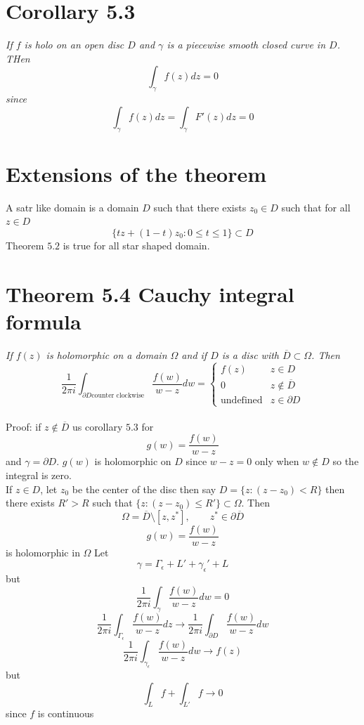 \documentclass[11pt]{article}
\begin{document}
\section{Corollary 5.3}
\emph{
    If $f$ is holo on an open disc $D$ and $\gamma$ is a piecewise smooth closed curve in  $D$. THen
    \[
    \int_{\gamma}^{}f(z)dz = 0
    \] 
    since
    \[
    \int_{\gamma}^{}f(z)dz = \int_{\gamma}^{}F'(z)dz = 0
    \] 
}

\section{Extensions of the theorem}
A satr like domain is a domain $D$ such that there exists  $z_0 \in D$ such that for all $z \in D$
 \[
     \{tz + (1-t)z_0 : 0 \le t \le 1\} \subset D
\] 
Theorem $5.2$ is true for all star shaped domain.

\section{Theorem 5.4 Cauchy integral formula}
\emph{
    If $f(z)$ is holomorphic on a domain  $\Omega$ and if  $D$ is a disc with $\overline{D} \subset \Omega$. Then
    \[
        \frac{1}{2\pi i} \int_{\partial D \text{counter clockwise}}^{}\frac{f(w)}{w-z}dw = 
        \begin{cases}
            f(z) & z \in D\\
            0 & z \not\in \overline{D}\\
            \text{undefined} & z \in \partial D
        \end{cases}
    \] 
}\\
Proof: if $z \not\in \overline{ D}$  us corollary $5.3$ for 
 \[
g(w) = \frac{f(w)}{w-z}
\] 
and $\gamma = \partial D$. $g(w)$ is holomorphic on  $D$ since  $w-z = 0 $ only when  $w \not\in D$ so the integral is zero.\\
If  $z \in D$, let $z_0$ be the center of the disc then say $D = \{z : (z-z_0) < R\}$ then there exists $ R' > R$ such that  $\{z : (z-z_0) \le R'\} \subset \Omega$.
Then
\[
    \Omega = \overline{D} \setminus [z,z^{*}], \qquad z^{*} \in \partial \overline{D}
\] 
\[
g(w) = \frac{f(w)}{w-z}
\] 
is holomorphic in $\Omega$ 
Let
\[
\gamma = \Gamma_\epsilon + L' + \gamma_\epsilon' + L
\] 
but
\[
\frac{1}{2\pi i} \int_{\gamma}^{} \frac{f(w)}{w-z}dw = 0
\] 
\[
\frac{1}{2\pi i} \int_{\Gamma_\epsilon}^{}\frac{f(w)}{w-z} dz \rightarrow \frac{1}{2\pi i}\int_{\partial D}^{}\frac{f(w)}{w-z}dw
\] 
\[
\frac{1}{2\pi i} \int_{\gamma_\epsilon}^{}\frac{f(w)}{w-z}dw \rightarrow f(z)
\] 
but
\[
\int_{L}^{}f + \int_{L'}^{}f \rightarrow 0
\] 
since $f$ is continuous
\end{document}
